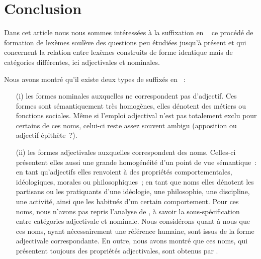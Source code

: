 \documentclass[output=paper]{LSP/langsci}
\begin{document}
\section{Conclusion}
Dans cet article nous nous sommes intéressées à la suffixation en \iste\   ce procédé de formation de lexèmes soulève des questions peu étudiées jusqu'à présent et qui concernent la relation entre lexèmes construits de forme identique mais de catégories différentes, ici adjectivales et nominales.

  
Nous avons montré qu'il existe deux types de suffixés en \iste ~:

\begin{enumerate}
\item[(i)] les formes nominales auxquelles ne correspondent pas d'adjectif. Ces formes sont sémantiquement très homogènes, elles dénotent des métiers ou fonctions sociales. Même si l'emploi adjectival n'est pas totalement exclu pour certains de ces noms, celui-ci reste assez souvent ambigu (apposition ou adjectif épithète~?).

\item[(ii)] les formes adjectivales auxquelles correspondent des noms. Celles-ci présentent elles aussi une grande homogénéité d'un point de vue sémantique~: en tant qu'adjectifs elles renvoient à des propriétés comportementales, idéologiques, mo\-rales ou philosophiques~; en tant que noms elles dénotent les partisans ou les pratiquants d'une idéologie, une philosophie, une discipline, une activité, ainsi que les habitués d'un certain comportement. Pour ces noms, nous n'avons pas repris l'analyse de \cite{roche11}, à savoir la sous-spécification entre catégories adjectivale et nominale. Nous considérons quant à nous que ces noms, ayant nécessairement une référence humaine, sont issus de la forme adjectivale corres\-pondante. En outre, nous avons montré que ces noms, qui présentent toujours des propriétés adjectivales, sont obtenus par .
\end{enumerate}
\end{document}
